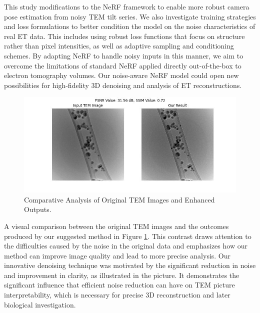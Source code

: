 \vspace{10pt}

This study modifications to the NeRF framework to enable more robust camera pose estimation from noisy TEM tilt series. We also investigate training strategies and loss formulations to better condition the model on the noise characteristics of real ET data. This includes using robust loss functions that focus on structure rather than pixel intensities, as well as adaptive sampling and conditioning schemes. By adapting NeRF to handle noisy inputs in this manner, we aim to overcome the limitations of standard NeRF applied directly out-of-the-box to electron tomography volumes. Our noise-aware NeRF model could open new possibilities for high-fidelity 3D denoising and analysis of ET reconstructions.

\vspace{20pt}

\begin{figure}[thbp]
\centering
\includegraphics[width=1\textwidth]{img/comparison_image.jpg}
\caption{Comparative Analysis of Original TEM Images and Enhanced Outputs.}\label{fig: Comparative Analysis of Original TEM Images and Enhanced Outputs}
\end{figure}


A visual comparison between the original TEM images and the outcomes produced by our suggested method in Figure \ref{fig: Comparative Analysis of Original TEM Images and Enhanced Outputs}. This contrast draws attention to the difficulties caused by the noise in the original data and emphasizes how our method can improve image quality and lead to more precise analysis. Our innovative denoising technique was motivated by the significant reduction in noise and improvement in clarity, as illustrated in the picture. It demonstrates the significant influence that efficient noise reduction can have on TEM picture interpretability, which is necessary for precise 3D reconstruction and later biological investigation.

\vspace{10pt}